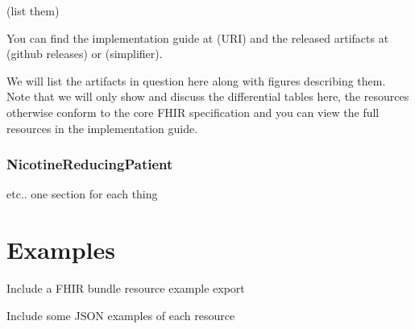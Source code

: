 \documentclass[12px]{report}
\begin{document}
(list them)

You can find the implementation guide at (URI) and the released artifacts at (github releases) or (simplifier).

We will list the artifacts in question here along with figures describing them. Note that we will only show and discuss the differential tables here, the resources otherwise conform to the core FHIR specification and you can view the full resources in the implementation guide.

\subsection{NicotineReducingPatient}

etc.. one section for each thing

\printbibliography[heading=bibintoc, title={References}]


\appendix

\chapter{Examples}
\label{app:ex}

Include a FHIR bundle resource example export

Include some JSON examples of each resource
\end{document}
